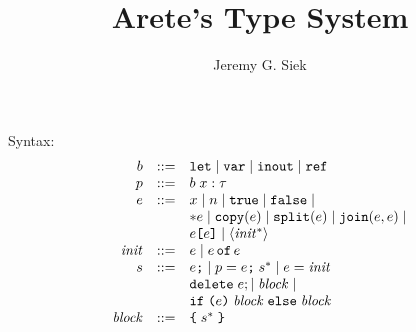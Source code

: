 \documentclass{article}
\title{Arete's Type System}
\author{Jeremy G. Siek}
\begin{document}
\maketitle

Syntax:
\[
\begin{array}{rcl}
  b &::= & \mathtt{let} \mid \mathtt{var} \mid \mathtt{inout}
         \mid \mathtt{ref}\\
  p &::= & b \; x : \tau \\
  e &::= & x \mid n \mid \mathtt{true} \mid \mathtt{false} \mid\\
    & & \mathtt{*} e \mid \mathtt{copy}(e) \mid
        \mathtt{split}(e) \mid \mathtt{join}(e,e) \mid \\
    & & e\texttt{[}e\texttt{]} \mid \langle \mathit{init}^{*} \rangle \\
  \mathit{init} & ::= & e \mid e \mathop{\mathtt{of}} e \\
  s &::= & e \texttt{;} \mid p = e\texttt{;} \; s^{*} \mid e = \mathit{init}\\
  & & \mathtt{delete}\; e; \mid \mathit{block} \mid \\
  & & \mathtt{if}\; \texttt{(}e\texttt{)}\; \mathit{block}\;\mathtt{else}\; \mathit{block}\\
  \mathit{block} &::= & \verb|{| \; s^{*} \; \verb|}|
\end{array}
\]
\end{document}
